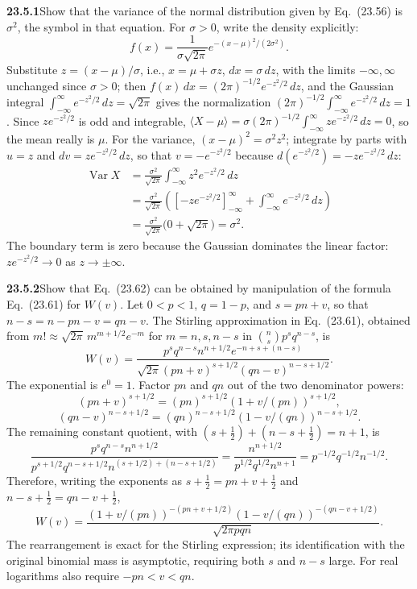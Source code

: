 \par\bigskip
\noindent\textbf{23.5.1}\quad Show that the variance of the
normal distribution given by Eq.~(23.56) is $\sigma^{2}$, the
symbol in that equation. 
\solution
For $\sigma>0$, write the density explicitly:
\[
f(x)=\frac1{\sigma\sqrt{2\pi}}
 e^{-(x-\mu)^2/(2\sigma^2)}.
\]
Substitute $z=(x-\mu)/\sigma$, i.e., $x=\mu+\sigma z$, $dx=\sigma\,dz$,
with the limits $-\infty,\infty$ unchanged since $\sigma>0$; then
$f(x)\,dx=(2\pi)^{-1/2}e^{-z^2/2}\,dz$, and the Gaussian integral
$\int_{-\infty}^{\infty}e^{-z^2/2}\,dz=\sqrt{2\pi}$ gives the
normalization $(2\pi)^{-1/2}\int_{-\infty}^{\infty}e^{-z^2/2}\,dz=1$.
Since $ze^{-z^2/2}$ is odd and integrable,
$\langle X-\mu\rangle=\sigma(2\pi)^{-1/2}\int_{-\infty}^{\infty}
ze^{-z^2/2}\,dz=0$, so the mean really is $\mu$.
For the variance, $(x-\mu)^2=\sigma^2z^2$; integrate by parts with
$u=z$ and $dv=ze^{-z^2/2}\,dz$, so that $v=-e^{-z^2/2}$ because
$d(e^{-z^2/2})=-ze^{-z^2/2}\,dz$:
\begin{align*}
\operatorname{Var}X
&=\frac{\sigma^2}{\sqrt{2\pi}}
 \int_{-\infty}^{\infty}z^2e^{-z^2/2}\,dz\\
&=\frac{\sigma^2}{\sqrt{2\pi}}
 \left([-ze^{-z^2/2}]_{-\infty}^{\infty}
 +\int_{-\infty}^{\infty}e^{-z^2/2}\,dz\right)\\
&=\frac{\sigma^2}{\sqrt{2\pi}}\bigl(0+\sqrt{2\pi}\bigr)
=\boxed{\sigma^2}.
\end{align*}
The boundary term is zero because the Gaussian dominates the linear
factor: $ze^{-z^2/2}\to0$ as $z\to\pm\infty$.


\par\bigskip
\noindent\textbf{23.5.2}\quad Show that Eq.~(23.62) can be
obtained by manipulation of the formula Eq.~(23.61) for $W(v)$.
\solution
Let $0<p<1$, $q=1-p$, and $s=pn+v$, so that $n-s=n-pn-v=qn-v$.
The Stirling approximation in Eq.~(23.61), obtained from
$m!\approx\sqrt{2\pi}\,m^{m+1/2}e^{-m}$ for $m=n,s,n-s$ in
$\binom nsp^sq^{n-s}$, is
\[
W(v)=\frac{p^sq^{n-s}n^{n+1/2}e^{-n+s+(n-s)}}
 {\sqrt{2\pi}(pn+v)^{s+1/2}(qn-v)^{n-s+1/2}}.
\]
The exponential is $e^0=1$. Factor $pn$ and $qn$ out of the two
denominator powers:
\[
(pn+v)^{s+1/2}=(pn)^{s+1/2}(1+v/(pn))^{s+1/2},
\]
\[
(qn-v)^{n-s+1/2}=(qn)^{n-s+1/2}(1-v/(qn))^{n-s+1/2}.
\]
The remaining constant quotient, with $(s+\tfrac12)+(n-s+\tfrac12)=n+1$,
is
\[
\frac{p^sq^{n-s}n^{n+1/2}}
 {p^{s+1/2}q^{n-s+1/2}n^{(s+1/2)+(n-s+1/2)}}
=\frac{n^{n+1/2}}{p^{1/2}q^{1/2}n^{n+1}}
=p^{-1/2}q^{-1/2}n^{-1/2}.
\]
Therefore, writing the exponents as $s+\frac12=pn+v+\frac12$ and
$n-s+\frac12=qn-v+\frac12$,
\[
\boxed{W(v)=\frac{(1+v/(pn))^{-(pn+v+1/2)}
 (1-v/(qn))^{-(qn-v+1/2)}}{\sqrt{2\pi pqn}}}.
\]
The rearrangement is exact for the Stirling expression; its identification
with the original binomial mass is asymptotic, requiring both $s$ and $n-s$
large. For real logarithms also require $-pn<v<qn$.


